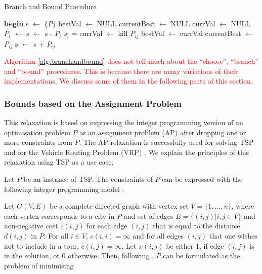 \documentclass{article}
\theoremstyle{definition}
\begin{document}
\begin{algorithm}
\color{red}
\centering
\caption{Branch and Bound Procedure}
\label{alg:branchandbound}
\begin{algorithmic}[1]
\State \textbf{begin}
\State s $\gets$ \{$P$\} 
\State bestVal $\gets$ NULL
\State currentBest $\gets$ NULL
\State currVal $\gets$ NULL
\State $P_{i}$ $\gets$  
\State s $\gets$ s - $P_{i}$
\State $s_{i}$ =  
\State currVal $\gets$  
\State kill $P_{ij}$ 
\State bestVal $\gets$ currVal
\State currentBest $\gets$ $P_{ij}$
\Else
\State s $\gets$ s + $P_{ij}$
\EndIf
\EndFor
\EndWhile
\State {}
\EndProcedure
\end{algorithmic}
\end{algorithm}

\textcolor{red}{
Algorithm \ref{alg:branchandbound} does not tell much about the ``choose'', ``branch'' and ``bound'' procedures. This is because there are many variations of their implementations. We discuss some of them in the following parts of this section.}

\subsubsection{Bounds based on the Assignment Problem}
This relaxation is based on expressing the integer programming version of an optimisation problem $P$ as an assignment problem (AP) after dropping one or more constraints from $P$.
The AP relaxation is successfully used for solving TSP \cite{Little63,Eastman58,Bellmore71,tspbible,Baker83} and for the Vehicle Routing Problem (VRP) \citep{Laporte86,vrpbible}. We explain the principles of this relaxation using TSP as a use case.

Let $P$ be an instance of TSP. The constraints of $P$ can be expressed with the following integer programming model \citep{tspbible,Dantzig54,Little63}:

Let $G(V,E)$ be a complete directed graph with vertex set $V = \{1,...,n\}$, where each vertex corresponds to a city in $P$ and set of edges $E = \{(i,j) | i,j \in V\}$ and non-negative cost $c(i,j)$ for each edge $(i,j)$ that is equal to the distance $d(i,j)$ in $P$. For all $i \in V$, $c(i,i) = \infty$ and for all edges $(i,j)$ that one wishes not to include in a tour, $c(i,j) = \infty$. Let $x(i,j)$ be either 1, if edge $(i,j)$ is in the solution, or 0 otherwise. Then, following \cite{Dantzig54}, $P$ can be formulated as the problem of minimising
\end{document}
